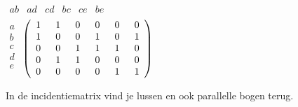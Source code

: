 \begin{center}
\mbox{\space \space \space}
$\begin{array}{cccccc}
ab & ad & cd & bc & ce & be\\
\end{array}
$\\
$
\begin{array}{c}
a\\
b\\
c\\
d\\
e\\
\end{array}
$
$
\left(
\begin{array}{cccccc}
1 & \hspace{0.18cm} 1 & \hspace{0.18cm}0 & \hspace{0.18cm}0 & \hspace{0.18cm}0 & \hspace{0.18cm}0\\
1 & \hspace{0.18cm}0 & \hspace{0.18cm}0 & \hspace{0.18cm}1 & \hspace{0.18cm}0 & \hspace{0.18cm}1\\
0 & \hspace{0.18cm}0 & \hspace{0.18cm}1 & \hspace{0.18cm}1 & \hspace{0.18cm}1 & \hspace{0.18cm}0\\
0 & \hspace{0.18cm}1 & \hspace{0.18cm}1 & \hspace{0.18cm}0 & \hspace{0.18cm}0 & \hspace{0.18cm}0\\
0 & \hspace{0.18cm}0 & \hspace{0.18cm}0 & \hspace{0.18cm}0 & \hspace{0.18cm}1 & \hspace{0.18cm}1\\
\end{array}
\right)
$
\end{center}

In de incidentiematrix vind je lussen en ook parallelle bogen terug.



